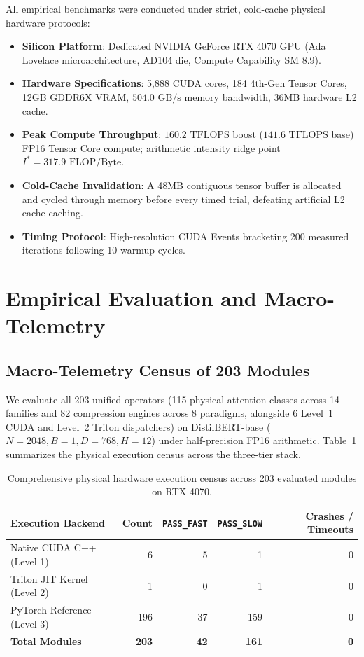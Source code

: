 \documentclass{article}
\newcommand{\passfast}{\texttt{PASS\_FAST}}
\newcommand{\passslow}{\texttt{PASS\_SLOW}}
\begin{document}
All empirical benchmarks were conducted under strict, cold-cache physical hardware protocols:
\begin{itemize}
    \item \textbf{Silicon Platform}: Dedicated NVIDIA GeForce RTX 4070 GPU (Ada Lovelace microarchitecture, AD104 die, Compute Capability SM 8.9).
    \item \textbf{Hardware Specifications}: 5,888 CUDA cores, 184 4th-Gen Tensor Cores, 12GB GDDR6X VRAM, $504.0\text{ GB/s}$ memory bandwidth, 36MB hardware L2 cache.
    \item \textbf{Peak Compute Throughput}: $160.2\text{ TFLOPS}$ boost ($141.6\text{ TFLOPS}$ base) FP16 Tensor Core compute; arithmetic intensity ridge point $I^* = 317.9\text{ FLOP/Byte}$.
    \item \textbf{Cold-Cache Invalidation}: A 48MB contiguous tensor buffer is allocated and cycled through memory before every timed trial, defeating artificial L2 cache caching.
    \item \textbf{Timing Protocol}: High-resolution CUDA Events bracketing 200 measured iterations following 10 warmup cycles.
\end{itemize}

\section{Empirical Evaluation and Macro-Telemetry}
\label{sec:experiments}

\subsection{Macro-Telemetry Census of 203 Modules}
We evaluate all 203 unified operators (115 physical attention classes across 14 families and 82 compression engines across 8 paradigms, alongside 6 Level~1 CUDA and Level~2 Triton dispatchers) on DistilBERT-base ($N=2048, B=1, D=768, H=12$) under half-precision FP16 arithmetic. Table~\ref{tab:icml_dispatch} summarizes the physical execution census across the three-tier stack.

\begin{table}[ht]
\centering
\caption{Comprehensive physical hardware execution census across 203 evaluated modules on RTX 4070.}
\label{tab:icml_dispatch}
\begin{tabular}{lrrrr}
\toprule
\textbf{Execution Backend} & \textbf{Count} & \textbf{\passfast{}} & \textbf{\passslow{}} & \textbf{Crashes / Timeouts} \\
\midrule
Native CUDA C++ (Level 1) & 6 & 5 & 1 & 0 \\
Triton JIT Kernel (Level 2) & 1 & 0 & 1 & 0 \\
PyTorch Reference (Level 3) & 196 & 37 & 159 & 0 \\
\midrule
\textbf{Total Modules} & \textbf{203} & \textbf{42} & \textbf{161} & \textbf{0} \\
\bottomrule
\end{tabular}
\end{table}
\end{document}
